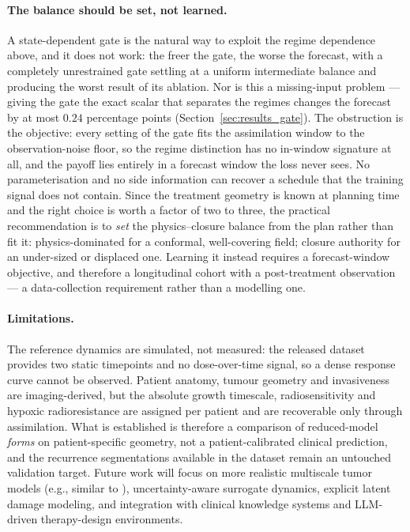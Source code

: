 \paragraph{The balance should be set, not learned.} A state-dependent gate is
the natural way to exploit the regime dependence above, and it does not work:
the freer the gate, the worse the forecast, with a completely unrestrained gate
settling at a uniform intermediate balance and producing the worst result of its
ablation. Nor is this a missing-input problem --- giving the gate the exact
scalar that separates the regimes changes the forecast by at most $0.24$
percentage points (Section~\ref{sec:results_gate}). The obstruction is the
objective: every setting of the gate fits the assimilation window to the
observation-noise floor, so the regime distinction has no in-window signature at
all, and the payoff lies entirely in a forecast window the loss never sees. No
parameterisation and no side information can recover a schedule that the
training signal does not contain. Since the treatment geometry is known at
planning time and the right choice is worth a factor of two to three, the
practical recommendation is to \emph{set} the physics--closure balance from the
plan rather than fit it: physics-dominated for a conformal, well-covering field;
closure authority for an under-sized or displaced one. Learning it instead
requires a forecast-window objective, and therefore a longitudinal cohort with a
post-treatment observation --- a data-collection requirement rather than a
modelling one.

\paragraph{Limitations.} The reference dynamics are simulated, not measured: the
released dataset provides two static timepoints and no dose-over-time signal, so
a dense response curve cannot be observed. Patient anatomy, tumour geometry and
invasiveness are imaging-derived, but the absolute growth timescale,
radiosensitivity and hypoxic radioresistance are assigned per patient and are
recoverable only through assimilation. What is established is therefore a
comparison of reduced-model \emph{forms} on patient-specific geometry, not a
patient-calibrated clinical prediction, and the recurrence segmentations
available in the dataset remain an untouched validation target.
Future work will focus on more realistic multiscale tumor models
(e.g., similar to \cite{Klusek2019TumorGPU}), uncertainty-aware
surrogate dynamics, explicit latent damage modeling, and integration
with clinical knowledge systems and LLM-driven therapy-design
environments.
